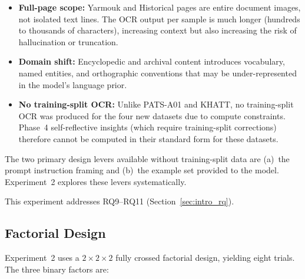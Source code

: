 \begin{itemize}
  \item \textbf{Full-page scope:} Yarmouk and Historical pages are entire
        document images, not isolated text lines. The OCR output per sample
        is much longer (hundreds to thousands of characters), increasing
        context but also increasing the risk of hallucination or truncation.
  \item \textbf{Domain shift:} Encyclopedic and archival content introduces
        vocabulary, named entities, and orthographic conventions that may be
        under-represented in the model's language prior.
  \item \textbf{No training-split OCR:} Unlike PATS-A01 and KHATT, no
        training-split OCR was produced for the four new datasets due to
        compute constraints. Phase~4 self-reflective insights (which require
        training-split corrections) therefore cannot be computed in their
        standard form for these datasets.
\end{itemize}

The two primary design levers available without training-split data are
(a)~the prompt instruction framing and (b)~the example set provided to the
model. Experiment~2 explores these levers systematically.

This experiment addresses RQ9--RQ11 (Section~\ref{sec:intro_rq}).

\subsection{Factorial Design}
\label{subsec:exp2_design}

Experiment~2 uses a $2 \times 2 \times 2$ fully crossed factorial design,
yielding eight trials. The three binary factors are:

